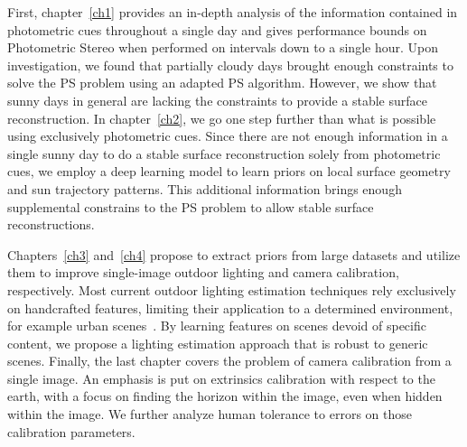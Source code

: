 First, chapter~\ref{ch1} provides an in-depth analysis of the information contained in photometric cues throughout a single day and gives performance bounds on Photometric Stereo when performed on intervals down to a single hour. Upon investigation, we found that partially cloudy days brought enough constraints to solve the PS problem using an adapted PS algorithm. However, we show that sunny days in general are lacking the constraints to provide a stable surface reconstruction. In chapter~\ref{ch2}, we go one step further than what is possible using exclusively photometric cues. Since there are not enough information in a single sunny day to do a stable surface reconstruction solely from photometric cues, we employ a deep learning model to learn priors on local surface geometry and sun trajectory patterns. This additional information brings enough supplemental constrains to the PS problem to allow stable surface reconstructions.

Chapters~\ref{ch3} and~\ref{ch4} propose to extract priors from large datasets and utilize them to improve single-image outdoor lighting and camera calibration, respectively. Most current outdoor lighting estimation techniques rely exclusively on handcrafted features, limiting their application to a determined environment, for example urban scenes~\cite{lalonde-ijcv-12}. By learning features on scenes devoid of specific content, we propose a lighting estimation approach that is robust to generic scenes. Finally, the last chapter covers the problem of camera calibration from a single image. An emphasis is put on extrinsics calibration with respect to the earth, with a focus on finding the horizon within the image, even when hidden within the image. We further analyze human tolerance to errors on those calibration parameters.






